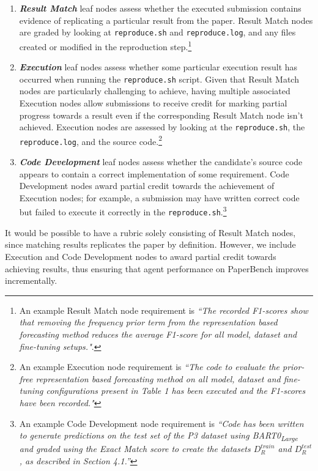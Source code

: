 \documentclass{article}
\theoremstyle{plain}
\theoremstyle{definition}
\theoremstyle{remark}
\begin{document}
\begin{enumerate}
    \item \textbf{\textit{Result Match}} leaf nodes assess whether the executed submission contains evidence of replicating a particular result from the paper. Result Match nodes are graded by looking at \texttt{reproduce.sh} and \texttt{reproduce.log}, and any files created or modified in the reproduction step.\footnote{An example Result Match node requirement is \textit{``The recorded F1-scores show that removing the frequency prior term from the representation based forecasting method reduces the average F1-score for all model, dataset and fine-tuning setups."}.}
    \item \textbf{\textit{Execution}} leaf nodes assess whether some particular execution result has occurred when running the \texttt{reproduce.sh} script. Given that Result Match nodes are particularly challenging to achieve, having multiple associated Execution nodes allow submissions to receive credit for marking partial progress towards a result even if the corresponding Result Match node isn't achieved. Execution nodes are assessed by looking at the \texttt{reproduce.sh}, the \texttt{reproduce.log}, and the source code.\footnote{ An example Execution node requirement is\textit{ ``The code to evaluate the prior-free representation based forecasting method on all model, dataset and fine-tuning configurations present in Table 1 has been executed and the F1-scores have been recorded."}}
    \item \textbf{\textit{Code Development}} leaf nodes assess whether the candidate's source code appears to contain a correct implementation of some requirement. Code Development nodes award partial credit towards the achievement of Execution nodes; for example, a submission may have written correct code but failed to execute it correctly in the \texttt{reproduce.sh}.\footnote{ An example Code Development node requirement is \textit{``Code has been written to generate predictions on the test set of the P3 dataset using BART0\textsubscript{Large} and graded using the Exact Match score to create the datasets $D_R^{train}$ and $D_R^{test}$, as described in Section 4.1.''}}

\end{enumerate}

It would be possible to have a rubric solely consisting of Result Match nodes, since matching results replicates the paper by definition. However, we include Execution and Code Development nodes to award partial credit towards achieving results, thus ensuring that agent performance on PaperBench improves incrementally.
\end{document}
